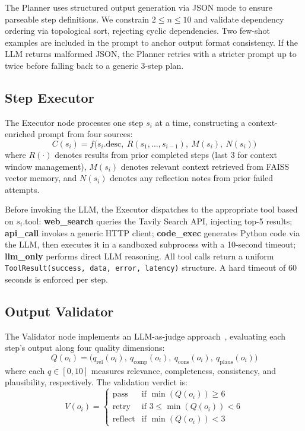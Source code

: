 \documentclass[conference]{IEEEtran}
\begin{document}
The Planner uses structured output generation via JSON mode to ensure parseable step definitions. We constrain $2 \leq n \leq 10$ and validate dependency ordering via topological sort, rejecting cyclic dependencies. Two few-shot examples are included in the prompt to anchor output format consistency. If the LLM returns malformed JSON, the Planner retries with a stricter prompt up to twice before falling back to a generic 3-step plan.

\subsection{Step Executor}

The Executor node processes one step $s_i$ at a time, constructing a context-enriched prompt from four sources:
\begin{equation}
    C(s_i) = f\big(s_i.\textrm{desc},\ R(s_1, \ldots, s_{i-1}),\ M(s_i),\ N(s_i)\big)
\end{equation}
where $R(\cdot)$ denotes results from prior completed steps (last 3 for context window management), $M(s_i)$ denotes relevant context retrieved from FAISS vector memory, and $N(s_i)$ denotes any reflection notes from prior failed attempts.

Before invoking the LLM, the Executor dispatches to the appropriate tool based on $s_i.\textrm{tool}$: \textbf{web\_search} queries the Tavily Search API, injecting top-5 results; \textbf{api\_call} invokes a generic HTTP client; \textbf{code\_exec} generates Python code via the LLM, then executes it in a sandboxed subprocess with a 10-second timeout; \textbf{llm\_only} performs direct LLM reasoning. All tool calls return a uniform \texttt{ToolResult(success, data, error, latency)} structure. A hard timeout of 60 seconds is enforced per step.

\subsection{Output Validator}

The Validator node implements an LLM-as-judge approach~\cite{zheng2023judging}, evaluating each step's output along four quality dimensions:
\begin{equation}
    Q(o_i) = \big(q_{\textrm{rel}}(o_i),\ q_{\textrm{comp}}(o_i),\ q_{\textrm{cons}}(o_i),\ q_{\textrm{plaus}}(o_i)\big)
\end{equation}
where each $q \in [0, 10]$ measures relevance, completeness, consistency, and plausibility, respectively. The validation verdict is:
\begin{equation}
    V(o_i) = \begin{cases}
        \textrm{pass} & \textrm{if } \min(Q(o_i)) \geq 6 \\
        \textrm{retry} & \textrm{if } 3 \leq \min(Q(o_i)) < 6 \\
        \textrm{reflect} & \textrm{if } \min(Q(o_i)) < 3
    \end{cases}
    \label{eq:verdict}
\end{equation}
\end{document}

